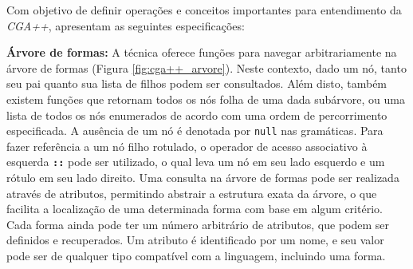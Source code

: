 \begin{figure}[h!]
	\centering
	\captionsetup{width=15cm}
	{}	
\end{figure}

Com objetivo de definir operações e conceitos importantes para entendimento da \textit{CGA++},  apresentam as seguintes especificações:

\textbf{Árvore de formas:} A técnica oferece funções para navegar arbitrariamente na árvore de formas (Figura \ref{fig:cga++_arvore}). Neste contexto, dado um nó, tanto seu pai quanto sua lista de filhos podem ser consultados. Além disto, também existem funções que retornam todos os nós folha de uma dada subárvore, ou uma lista de todos os nós enumerados de acordo com uma ordem de percorrimento especificada. A ausência de um nó é denotada por \texttt{null} nas gramáticas. Para fazer referência a um nó filho rotulado, o operador de acesso associativo à esquerda \textbf{\texttt{::}} pode ser utilizado, o qual leva um nó em seu lado esquerdo e um rótulo em seu lado direito. Uma consulta na árvore de formas pode ser realizada através de atributos, permitindo abstrair a estrutura exata da árvore, o que facilita a localização de uma determinada forma com base em algum critério. Cada forma ainda pode ter um número arbitrário de atributos, que podem ser definidos e recuperados. Um atributo é identificado por um nome, e seu valor pode ser de qualquer tipo compatível com a linguagem, incluindo uma forma.

